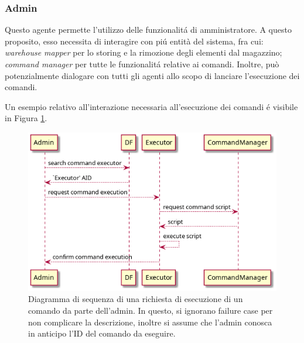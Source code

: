 \subsubsection{Admin}
Questo agente permette l'utilizzo delle funzionalit\'a di amministratore. A questo proposito, esso necessita di interagire con pi\'u entità del sistema, fra cui: \textit{warehouse mapper} per lo storing e la rimozione degli elementi dal magazzino; \textit{command manager} per tutte le funzionalit\'a relative ai comandi. Inoltre, può potenzialmente dialogare con tutti gli agenti allo scopo di lanciare l'esecuzione dei comandi.

Un esempio relativo all'interazione necessaria all'esecuzione dei comandi \'e visibile in Figura \ref{fig:command_execution-sequence_diagram}.
\begin{figure}[!ht]\centering
    \includegraphics[width=\textwidth]{section/design/figure/command_execution-sequence_diagram.png}
    \caption{Diagramma di sequenza di una richiesta di esecuzione di un comando da parte dell'admin. In questo, si ignorano failure case per non complicare la descrizione, inoltre si assume che l'admin conosca in anticipo l'ID del comando da eseguire.}
    \label{fig:command_execution-sequence_diagram}
\end{figure}

